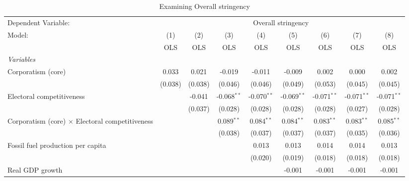 
\begin{table}[htbp]
   \caption{Examining Overall stringency}
   \centering
   \begin{tabular}{lcccccccc}
      \toprule
      Dependent Variable: & \multicolumn{8}{c}{Overall stringency}\\
      Model:                                                 & (1)     & (2)     & (3)           & (4)           & (5)           & (6)           & (7)           & (8)\\  
                                                             &  OLS    & OLS     & OLS           & OLS           & OLS           & OLS           & OLS           & OLS\\  
      \midrule
      \emph{Variables}\\
      Corporatism (core)                                     & 0.033   & 0.021   & -0.019        & -0.011        & -0.009        & 0.002         & 0.000         & 0.002\\   
                                                             & (0.038) & (0.038) & (0.046)       & (0.046)       & (0.049)       & (0.053)       & (0.045)       & (0.045)\\   
      Electoral competitiveness                              &         & -0.041  & -0.068$^{**}$ & -0.070$^{**}$ & -0.069$^{**}$ & -0.071$^{**}$ & -0.071$^{**}$ & -0.071$^{**}$\\   
                                                             &         & (0.037) & (0.028)       & (0.028)       & (0.028)       & (0.028)       & (0.027)       & (0.028)\\   
      Corporatism (core) $\times$ Electoral competitiveness  &         &         & 0.089$^{**}$  & 0.084$^{**}$  & 0.084$^{**}$  & 0.083$^{**}$  & 0.083$^{**}$  & 0.085$^{**}$\\   
                                                             &         &         & (0.038)       & (0.037)       & (0.037)       & (0.037)       & (0.035)       & (0.036)\\   
      Fossil fuel production per capita                      &         &         &               & 0.013         & 0.013         & 0.014         & 0.014         & 0.013\\   
                                                             &         &         &               & (0.020)       & (0.019)       & (0.018)       & (0.018)       & (0.018)\\   
      Real GDP growth                                        &         &         &               &               & -0.001        & -0.001        & -0.001        & -0.001\\   

\end{tabular}
\end{table}
